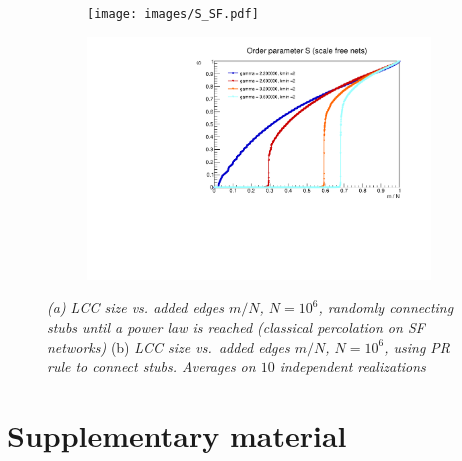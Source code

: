 \begin{figure}[H]
	\centering
	\begin{subfigure}[t]{0.48\linewidth}
		\texttt{[image: images/S\_SF.pdf]}
		\vspace{-28pt}
		\caption{}
		\label{fig::RGSF}
	\end{subfigure}
	\hspace{3pt}
	\begin{subfigure}[t]{0.48\linewidth}
		\includegraphics[width=\linewidth]{images/S_PR.pdf}
		\vspace{-28pt}
		\caption{} 
		\label{fig::PRSF}
	\end{subfigure}
	\vspace{-10pt}
	\caption{\textit{(a) LCC size vs. added edges $m/N$, $N = 10^6$, randomly connecting stubs until a power law is reached (classical percolation on SF networks)} (b) \textit{LCC size vs.\ added edges $m/N$, $N = 10^6$, using PR rule to connect stubs. Averages on $10$ independent realizations}}
\end{figure}
\newpage

\section{Supplementary material}
